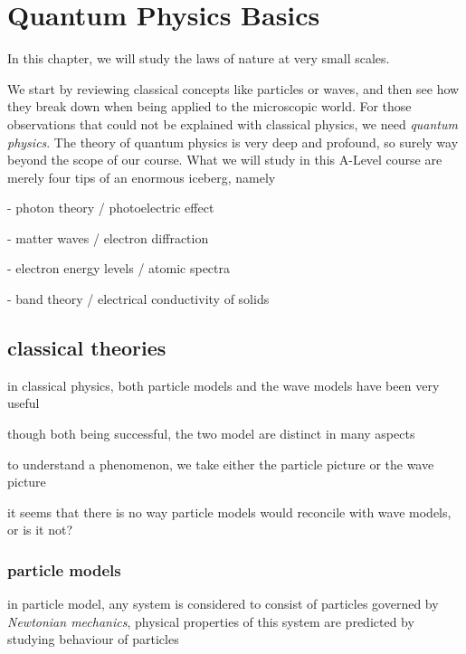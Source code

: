 \section{Quantum Physics Basics}

In this chapter, we will study the laws of nature at very small scales.

We start by reviewing classical concepts like particles or waves, and then see how they break down when being applied to the microscopic world. For those observations that could not be explained with classical physics, we need \emph{quantum physics}. The theory of quantum physics is very deep and profound, so surely way beyond the scope of our course. What we will study in this A-Level course are merely four tips of an enormous iceberg, namely

\begin{compactenum}
	\item[-] photon theory / photoelectric effect
	
	\item[-] matter waves / electron diffraction
	
	\item[-] electron energy levels / atomic spectra
	
	\item[-] band theory / electrical conductivity of solids
\end{compactenum}

\subsection{classical theories}

in classical physics, both particle models and the wave models have been very useful

though both being successful, the two model are distinct in many aspects

to understand a phenomenon, we take either the particle picture or the wave picture

it seems that there is no way particle models would reconcile with wave models, or is it not?

\subsubsection{particle models}

in particle model, any system is considered to consist of particles governed by \emph{Newtonian mechanics}, physical properties of this system are predicted by studying behaviour of particles

